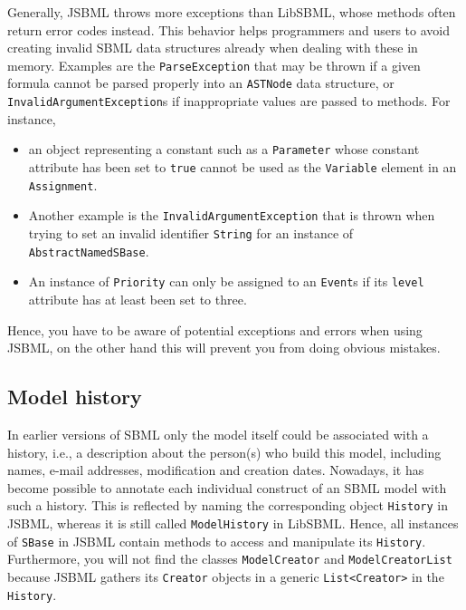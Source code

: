 \documentclass[
  BCOR12mm,
  letterpaper,
  11pt,
  headsepline,
  pointlessnumbers,
  tablecaptionabove,
  onelinecaption,
  headinclude,
  appendixprefix,
  idxtotoc,
  bibtotoc,
  twoside,
  titlepage
]{scrartcl}
\begin{document}
Generally, JSBML throws more exceptions than LibSBML, whose methods often return error codes instead. This behavior helps
programmers and users to avoid creating invalid SBML data structures already
when dealing with these in memory. Examples are the \texttt{ParseException}
 that
may be thrown if a given formula cannot be parsed properly into an
\texttt{ASTNode} data structure, or \texttt{InvalidArgumentException}s
 if inappropriate values are passed to methods. For instance,
\begin{itemize}
 \item an object representing
a constant such as a \texttt{Parameter}
 whose constant attribute has been set to
\texttt{true} cannot be used as the \texttt{Variable} element in an
\texttt{Assignment}.
 \item Another example is the \texttt{InvalidArgumentException} that
is thrown when trying to set an invalid identifier \texttt{String} for an instance of \texttt{AbstractNamedSBase}.
 \item An instance of \texttt{Priority} can only be assigned to an \texttt{Event}s if its \texttt{level} attribute has at least been set to three.
\end{itemize}
Hence, you have to be aware of potential
exceptions and errors when using JSBML, on the other hand this will
prevent you from doing obvious mistakes.


\subsection{Model history}

In earlier versions of SBML only the model itself could be associated
with a history, i.e., a description about the person(s) who build this model,
including names, e-mail addresses, modification and creation dates. Nowadays, it
has become possible to annotate each individual construct of an SBML model with
such a history. This is reflected by naming the corresponding object
\texttt{History}
in JSBML, whereas it is still called
\texttt{ModelHistory} in LibSBML. Hence, all
instances of \texttt{SBase} in JSBML contain methods to access and manipulate its
\texttt{History}. Furthermore, you will not find the classes
\texttt{ModelCreator}
and \texttt{ModelCreatorList} because JSBML
gathers its \texttt{Creator} objects
in a generic \texttt{List<Creator>} in the \texttt{History}.
\end{document}
